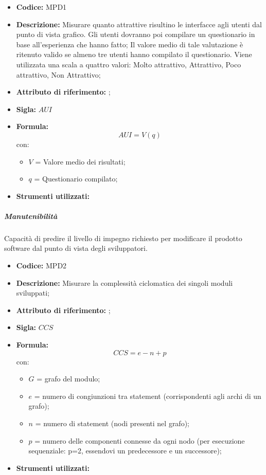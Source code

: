 \begin{itemize}
    \item \textbf{Codice: } MPD1
    \item \textbf{Descrizione:} Misurare quanto attrattive risultino le interfacce agli utenti dal punto di vista grafico.
    Gli utenti dovranno poi compilare un questionario in base all'esperienza che hanno fatto;
    Il valore medio di tale valutazione è ritenuto valido se almeno tre utenti hanno compilato il questionario. 
    Viene utilizzata una scala a quattro valori: Molto attrattivo, Attrattivo, Poco attrattivo, Non Attrattivo;
    \item \textbf{Attributo di riferimento:} ;
    \item \textbf{Sigla:} $AUI$
    \item \textbf{Formula:}$$AUI = V(q) $$
    con:
        \begin{itemize}
        \item $V$ = Valore medio dei risultati;
        \item $q$ = Questionario compilato;
        \end{itemize}
    \item \textbf{Strumenti utilizzati:}
\end{itemize}

\subparagraph{Manutenibilità}
Capacità di predire il livello di impegno richiesto per modificare il prodotto software dal punto di vista degli sviluppatori.           
    \begin{itemize}
    \item \textbf{Codice:} MPD2
    \item \textbf{Descrizione:} Misurare la complessità ciclomatica dei singoli moduli sviluppati;
    \item \textbf{Attributo di riferimento:} ;
    \item \textbf{Sigla:} $CCS$
    \item \textbf{Formula:} $$CCS = e - n + p$$
    con:
    \begin{itemize}
        \item $G$ = grafo del modulo;
        \item $e$ = numero di congiunzioni tra statement (corrispondenti agli archi di un grafo);
        \item $n$ = numero di statement (nodi presenti nel grafo);
        \item $p$ = numero delle componenti connesse da ogni nodo (per esecuzione sequenziale: p=2, essendovi un predecessore e un successore);
    \end{itemize}

    \item \textbf{Strumenti utilizzati:}
\end{itemize}

